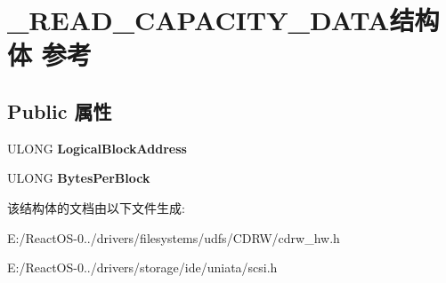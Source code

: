 \hypertarget{struct___r_e_a_d___c_a_p_a_c_i_t_y___d_a_t_a}{}\section{\+\_\+\+R\+E\+A\+D\+\_\+\+C\+A\+P\+A\+C\+I\+T\+Y\+\_\+\+D\+A\+T\+A结构体 参考}
\label{struct___r_e_a_d___c_a_p_a_c_i_t_y___d_a_t_a}
\subsection*{Public 属性}
\begin{DoxyCompactItemize}
\item 
\mbox{\label{struct___r_e_a_d___c_a_p_a_c_i_t_y___d_a_t_a_ae37562565751604c88932ca5f7c779e5}} 
U\+L\+O\+NG {\bfseries Logical\+Block\+Address}
\item 
\mbox{\label{struct___r_e_a_d___c_a_p_a_c_i_t_y___d_a_t_a_a5ae9fd9462e3616b4f8dfb55ca66dd57}} 
U\+L\+O\+NG {\bfseries Bytes\+Per\+Block}
\end{DoxyCompactItemize}


该结构体的文档由以下文件生成\+:\begin{DoxyCompactItemize}
\item 
E\+:/\+React\+O\+S-\/0../drivers/filesystems/udfs/\+C\+D\+R\+W/cdrw\+\_\+hw.\+h\item 
E\+:/\+React\+O\+S-\/0../drivers/storage/ide/uniata/scsi.\+h\end{DoxyCompactItemize}
